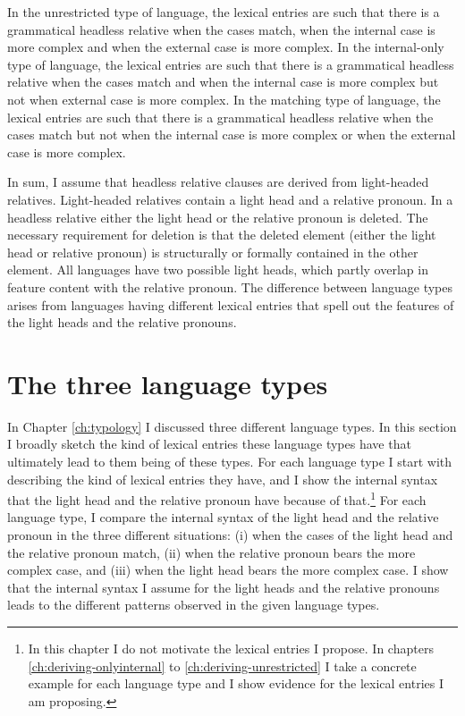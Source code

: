 In the unrestricted type of language, the lexical entries are such that there is a grammatical headless relative when the cases match, when the internal case is more complex and when the external case is more complex.
In the internal-only type of language, the lexical entries are such that there is a grammatical headless relative when the cases match and when the internal case is more complex but not when external case is more complex.
In the matching type of language, the lexical entries are such that there is a grammatical headless relative when the cases match but not when the internal case is more complex or when the external case is more complex.

In sum, I assume that headless relative clauses are derived from light-headed relatives. Light-headed relatives contain a light head and a relative pronoun. In a headless relative either the light head or the relative pronoun is deleted.
The necessary requirement for deletion is that the deleted element (either the light head or relative pronoun) is structurally or formally contained in the other element.
All languages have two possible light heads, which partly overlap in feature content with the relative pronoun.
The difference between language types arises from languages having different lexical entries that spell out the features of the light heads and the relative pronouns.


\section{The three language types}\label{sec:three-types}

In Chapter \ref{ch:typology} I discussed three different language types. In this section I broadly sketch the kind of lexical entries these language types have that ultimately lead to them being of these types.
For each language type I start with describing the kind of lexical entries they have, and I show the internal syntax that the light head and the relative pronoun have because of that.\footnote{
In this chapter I do not motivate the lexical entries I propose. In chapters \ref{ch:deriving-onlyinternal} to \ref{ch:deriving-unrestricted} I take a concrete example for each language type and I show evidence for the lexical entries I am proposing.}
For each language type, I compare the internal syntax of the light head and the relative pronoun in the three different situations: (i) when the cases of the light head and the relative pronoun match, (ii) when the relative pronoun bears the more complex case, and (iii) when the light head bears the more complex case.
I show that the internal syntax I assume for the light heads and the relative pronouns leads to the different patterns observed in the given language types.


